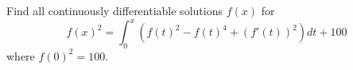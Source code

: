 Find all continuously differentiable solutions $f(x)$ for
$$ f(x)^2 = \int_{0}^{x} (f(t)^2 - f(t)^4 + (f'(t))^2) dt + 100 $$
where $f(0)^2 = 100$.
